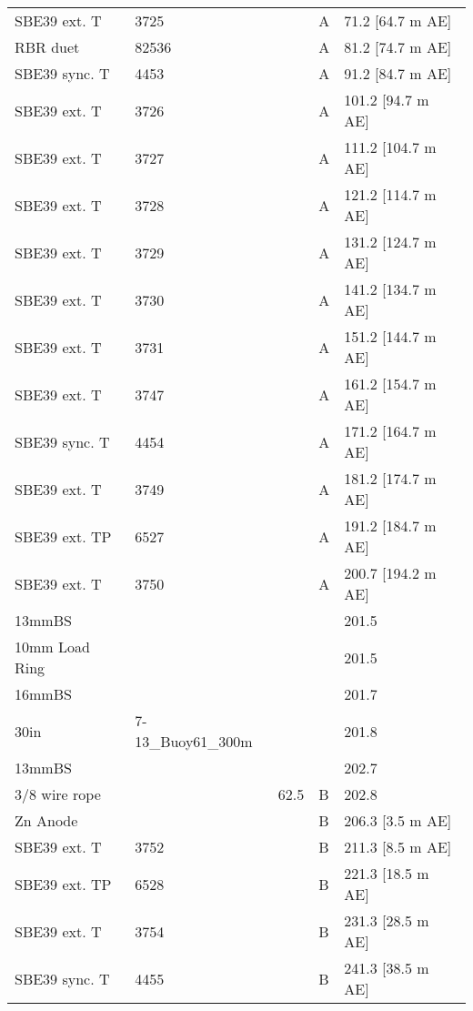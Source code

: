 \documentclass{article}
\begin{document}
\begin{table}[!htbp]
\begin{tabular}{lllll}
SBE39 ext. T & 3725 &  & A & 71.2 [64.7 m AE] \\
RBR duet & 82536 &  & A & 81.2 [74.7 m AE] \\
SBE39 sync. T & 4453 &  & A & 91.2 [84.7 m AE] \\
SBE39 ext. T & 3726 &  & A & 101.2 [94.7 m AE] \\
SBE39 ext. T & 3727 &  & A & 111.2 [104.7 m AE] \\
SBE39 ext. T & 3728 &  & A & 121.2 [114.7 m AE] \\
SBE39 ext. T & 3729 &  & A & 131.2 [124.7 m AE] \\
SBE39 ext. T & 3730 &  & A & 141.2 [134.7 m AE] \\
SBE39 ext. T & 3731 &  & A & 151.2 [144.7 m AE] \\
SBE39 ext. T & 3747 &  & A & 161.2 [154.7 m AE] \\
SBE39 sync. T & 4454 &  & A & 171.2 [164.7 m AE] \\
SBE39 ext. T & 3749 &  & A & 181.2 [174.7 m AE] \\
SBE39 ext. TP & 6527 &  & A & 191.2 [184.7 m AE] \\
SBE39 ext. T & 3750 &  & A & 200.7 [194.2 m AE] \\
13mmBS &  &  &  & 201.5 \\
10mm Load Ring &  &  &  & 201.5 \\
16mmBS &  &  &  & 201.7 \\
30in & 7-13\_Buoy61\_300m &  &  & 201.8 \\
13mmBS &  &  &  & 202.7 \\
3/8 wire rope &  & 62.5 & B & 202.8 \\
Zn Anode &  &  & B & 206.3 [3.5 m AE] \\
SBE39 ext. T & 3752 &  & B & 211.3 [8.5 m AE] \\
SBE39 ext. TP & 6528 &  & B & 221.3 [18.5 m AE] \\
SBE39 ext. T & 3754 &  & B & 231.3 [28.5 m AE] \\
SBE39 sync. T & 4455 &  & B & 241.3 [38.5 m AE] \\
\bottomrule
\end{tabular}
\end{table}
\end{document}
